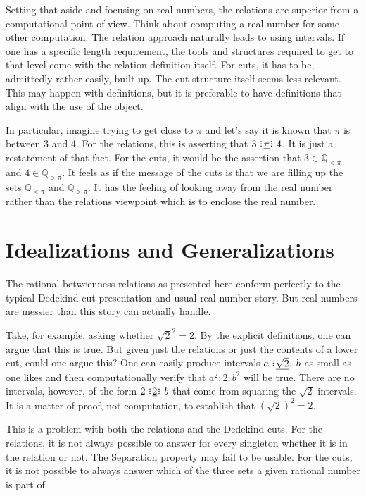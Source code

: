 \documentclass[12pt]{article}
\newcommand{\qcut}[2][x]{\ensuremath{\mathbb{Q}_{#2 #1}}}
\newcommand{\qlt}[1][x]{\qcut[#1]{<}}
\newcommand{\qgt}[1][x]{\qcut[#1]{>}}
\begin{document}
Setting that aside and focusing on real numbers, the relations are superior from a computational point of view. Think about computing a real number for some other computation. The relation approach naturally leads to using intervals. If one has a specific length requirement, the tools and structures required to get to that level come with the relation definition itself. For cuts, it has to be, admittedly rather easily, built up. The cut structure itself seems less relevant. This may happen with definitions, but it is preferable to have definitions that align with the use of the object. 

In particular, imagine trying to get close to $\pi$ and let's say it is known that $\pi$ is between 3 and 4. For the relations, this is asserting that $3 \xrel[\pi] 4$. It is just a restatement of that fact. For the cuts, it would be the assertion that $3 \in \qlt[\pi]$ and $4 \in \qgt[\pi]$. It feels as if the message of the cuts is that we are filling up the sets $\qlt[\pi]$ and $\qgt[\pi]$. It has the feeling of looking away from the real number rather than the relations viewpoint which is to enclose the real number. 


\section{Idealizations and Generalizations}

The rational betweenness relations as presented here conform perfectly to the typical Dedekind cut presentation and usual real number story. But real numbers are messier than this story can actually handle. 

Take, for example, asking whether $\sqrt{2}^2 = 2$. By the explicit definitions, one can argue that this is true. But given just the relations or just the contents of a lower cut, could one argue this? One can easily produce intervals $a \xrel[\sqrt{2}] b$ as small as one likes and then computationally verify that $a^2 : 2 :b^2$ will be true. There are no intervals, however, of the form $2 \xrel[2] b$ that come from squaring the $\sqrt{2}$-intervals. It is a matter of proof, not computation, to establish that $(\sqrt{2})^2 = 2$.

This is a problem with both the relations and the Dedekind cuts. For the relations, it is not always possible to answer for every singleton whether it is in the relation or not. The Separation property may fail to be usable. For the cuts, it is not possible to always answer which of the three sets a given rational number is part of. 
\end{document}
